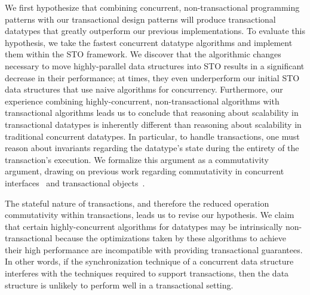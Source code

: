 We first hypothesize that combining concurrent, non-transactional programming patterns with our transactional design patterns will produce transactional datatypes that greatly outperform our previous implementations. To evaluate this hypothesis, we take the fastest concurrent datatype algorithms and implement them within the STO framework. We discover that the algorithmic changes necessary to move highly-parallel data structures into STO results in a significant decrease in their performance; at times, they even underperform our initial STO data structures that use naive algorithms for concurrency.
Furthermore, our experience combining highly-concurrent, non-transactional algorithms with transactional algorithms leads us to conclude that reasoning about scalability in transactional datatypes is inherently different than reasoning about scalability in traditional concurrent datatypes. In particular, to handle transactions, one must reason about invariants regarding the datatype's state during the entirety of the transaction's execution. We formalize this argument as a commutativity argument, drawing on previous work regarding commutativity in concurrent interfaces~\cite{scrule} and transactional objects~\cite{schwarz, weihl}.

The stateful nature of transactions, and therefore the reduced operation commutativity within transactions, leads us to revise our hypothesis. 
We claim that certain highly-concurrent algorithms for datatypes may be intrinsically non-transactional because the optimizations taken by these algorithms to achieve their high performance are incompatible with providing transactional guarantees. In other words, if the synchronization technique of a concurrent data structure interferes with the techniques required to support transactions, then the data structure is unlikely to perform well in a transactional setting. 

